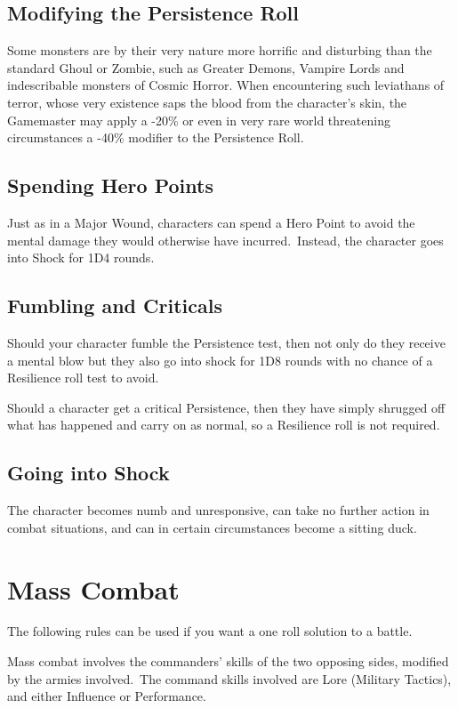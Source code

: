 \subsection{Modifying the Persistence Roll}
Some monsters are by their very nature more horrific and disturbing than the standard Ghoul or Zombie, such as Greater Demons, Vampire Lords and indescribable monsters of Cosmic Horror. When encountering such leviathans of terror, whose very existence saps the blood from the character’s skin, the Gamemaster may apply a -20\% or even in very rare world threatening circumstances a -40\% modifier to the Persistence Roll.


\subsection{Spending Hero Points}
Just as in a Major Wound, characters can spend a Hero Point to avoid the mental damage they would otherwise have incurred. Instead, the character goes into Shock for 1D4 rounds.


\subsection{Fumbling and Criticals}
Should your character fumble the Persistence test, then not only do they receive a mental blow but they also go into shock for 1D8 rounds with no chance of a Resilience roll test to avoid.

Should a character get a critical Persistence, then they have simply shrugged off what has happened and carry on as normal, so a Resilience roll is not required. 


\subsection{Going into Shock}
The character becomes numb and unresponsive, can take no further action in combat situations, and can in certain circumstances become a sitting duck. 


\section{Mass Combat}
The following rules can be used if you want a one roll solution to a battle.

Mass combat involves the commanders’ skills of the two opposing sides, modified by the armies involved. The command skills involved are Lore (Military Tactics), and either Influence or Performance.

